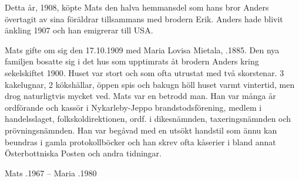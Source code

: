 Detta år, 1908, köpte Mats den halva hemmansdel som hans bror Anders övertagit av sina föräldrar tillsammans med brodern Erik. Anders hade blivit änkling 1907 och han emigrerar till USA.


Mats gifte om sig den 17.10.1909 med Maria Lovisa Mietala, .1885. Den nya familjen bosatte sig i det hus som upptimrats åt brodern Anders kring sekelskiftet 1900. Huset var stort och som ofta utrustat med två skorstenar. 3 kakelugnar, 2 kökshällar, öppen spis och bakugn höll huset varmt vintertid, men drog naturligtvis mycket ved.
Mats var en betrodd man. Han var många år ordförande och kassör i Nykarleby-Jeppo brandstodsförening, medlem i handelsslaget, folkskoldirektionen, ordf. i dikesnämnden, taxeringsnämnden och prövningsnämnden. Han var begåvad med en utsökt handstil som ännu kan beundras i gamla protokollböcker och han skrev ofta kåserier i bland annat Österbottniska Posten och andra tidningar.
\begin{jhchildren}
  \item {}
  \item {}
  \item {}
  \item {}
  \item {}
  \item {}
  \item {}
  \item {}
  \item {}
\end{jhchildren}
Mats .1967  --  Maria .1980


